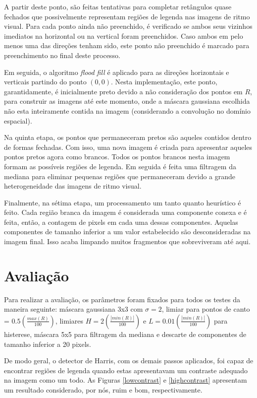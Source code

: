 \documentclass[12pt]{article}
\begin{document}
A partir deste ponto,  são feitas tentativas para completar retângulos
quase fechados  que possivelmente  representam regiões de  legenda nas
imagens  de ritmo  visual. Para  cada  ponto ainda  não preenchido,  é
verificado  se  ambos seus  vizinhos  imediatos  na  horizontal ou  na
vertical foram preenchidos.  Caso ambos  em pelo menos uma das direções
tenham sido, este ponto não preenchido é marcado para preenchimento no
final deste processo.

Em  seguida,  o  algoritmo  \textit{flood  fill} é  aplicado  para  as
direções  horizontais e verticais  partindo do  ponto $(0,  0)$. Nesta
implementação, este ponto, garantidamente, é inicialmente preto devido
a não  consideração dos pontos em  $R$, para construir  as imagens até
este momento, onde a máscara gaussiana escolhida não esta inteiramente
contida na imagem (considerando a convolução no domínio espacial).

Na  quinta  etapa,  os  pontos  que permaneceram  pretos  são  aqueles
contidos dentro de formas fechadas. Com isso, uma nova imagem é criada
para apresentar  aqueles pontos pretos  agora como brancos.   Todos os
pontos brancos  nesta imagem formam  as possíveis regiões  de legenda.
Em seguida  é feita  uma filtragem da  mediana para  eliminar pequenas
regiões que  permaneceram devido a grande  heterogeneidade das imagens
de ritmo visual.

Finalmente,  na  sétima  etapa,   um  processamento  um  tanto  quanto
heurístico é  feito.  Cada região  branca da imagem é  considerada uma
componente conexa e  é feita, então, a contagem de  pixels em cada uma
dessas  componentes.  Aquelas  componentes  de tamanho  inferior a  um
valor estabelecido  são desconsideradas  na imagem final.   Isso acaba
limpando muitos fragmentos que sobreviveram até aqui.

\section{Avaliação}

Para realizar a  avaliação, os parâmetros foram fixados  para todos os
testes da  maneira seguinte: máscara  gaussiana 3x3 com $\sigma  = 2$,
limiar para pontos de  canto = $0.5 (\frac{max(R)}{100})$, limiares $H
= 2  (\frac{|min(R)|}{100})$ e $L =  0.01 (\frac{|min(R)|}{100})$ para
histerese,  máscara  5x5  para  filtragem  da mediana  e  descarte  de
componentes de tamanho inferior a 20 pixels.

De modo geral,  o detector de Harris, com  os demais passos aplicados,
foi capaz de encontrar regiões de legenda quando estas apresentavam um
contraste   adequado   na   imagem   como   um   todo.    As   Figuras
\ref{lowcontrast}   e  \ref{highcontrast}   apresentam   um  resultado
considerado, por nós, ruim e bom, respectivamente.
\end{document}
